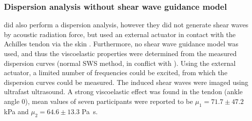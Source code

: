 \subsubsection{Dispersion analysis without shear wave guidance model}
\citeauthor{cortes_continuous_2015} did also perform a dispersion analysis, however they did not generate shear waves by acoustic radiation force, but used an external actuator in contact with the Achilles tendon via the skin \cite{cortes_continuous_2015}. Furthermore, no shear wave guidance model was used, and thus the viscoelastic properties were determined from the measured dispersion curves (normal SWS method, in conflict with \cite{brum_vivo_2014, helfenstein-didier_vivo_2016}). Using the external actuator, a limited number of frequencies could be excited, from which the dispersion curves could be measured. The induced shear waves were imaged using ultrafast ultrasound. A strong viscoelastic effect was found in the tendon (ankle angle \SI{0}{\deg}), mean values of seven participants were reported to be $\mu_1 = 71.7 \pm 47.2$ \si{\kilo\pascal} and $\mu_2 = 64.6 \pm 13.3$ \si{\pascal\second}. 

	
	




